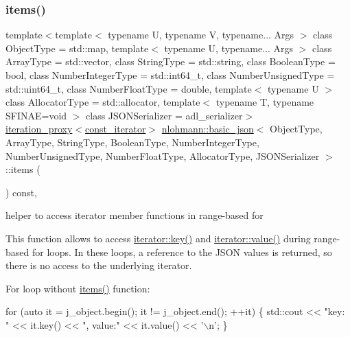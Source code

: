 \subsubsection{\texorpdfstring{items()}{items()}\hspace{0.1cm}{\footnotesize\ttfamily [2/2]}}
{\footnotesize\ttfamily template$<$template$<$ typename U, typename V, typename... Args $>$ class Object\+Type = std\+::map, template$<$ typename U, typename... Args $>$ class Array\+Type = std\+::vector, class String\+Type  = std\+::string, class Boolean\+Type  = bool, class Number\+Integer\+Type  = std\+::int64\+\_\+t, class Number\+Unsigned\+Type  = std\+::uint64\+\_\+t, class Number\+Float\+Type  = double, template$<$ typename U $>$ class Allocator\+Type = std\+::allocator, template$<$ typename T, typename S\+F\+I\+N\+A\+E=void $>$ class J\+S\+O\+N\+Serializer = adl\+\_\+serializer$>$ \\
\mbox{\hyperlink{classnlohmann_1_1detail_1_1iteration__proxy}{iteration\+\_\+proxy}}$<$\mbox{\hyperlink{classnlohmann_1_1basic__json_a41a70cf9993951836d129bb1c2b3126a}{const\+\_\+iterator}}$>$ \mbox{\hyperlink{classnlohmann_1_1basic__json}{nlohmann\+::basic\+\_\+json}}$<$ Object\+Type, Array\+Type, String\+Type, Boolean\+Type, Number\+Integer\+Type, Number\+Unsigned\+Type, Number\+Float\+Type, Allocator\+Type, J\+S\+O\+N\+Serializer $>$\+::items (\begin{DoxyParamCaption}{ }\end{DoxyParamCaption}) const\hspace{0.3cm}{\ttfamily [inline]}, {\ttfamily [noexcept]}}



helper to access iterator member functions in range-\/based for 

This function allows to access \mbox{\hyperlink{classnlohmann_1_1detail_1_1iter__impl_a15dfb2744fed2ef40c12a9e9a20d6dbc}{iterator\+::key()}} and \mbox{\hyperlink{classnlohmann_1_1detail_1_1iter__impl_ab447c50354c6611fa2ae0100ac17845c}{iterator\+::value()}} during range-\/based for loops. In these loops, a reference to the J\+S\+ON values is returned, so there is no access to the underlying iterator.

For loop without {\ttfamily \mbox{\hyperlink{classnlohmann_1_1basic__json_afe3e137ace692efa08590d8df40f58dd}{items()}}} function\+:


\begin{DoxyCode}
\textcolor{keywordflow}{for} (\textcolor{keyword}{auto} it = j\_object.begin(); it != j\_object.end(); ++it)
\{
    std::cout << \textcolor{stringliteral}{"key: "} << it.key() << \textcolor{stringliteral}{", value:"} << it.value() << \textcolor{charliteral}{'\(\backslash\)n'};
\}
\end{DoxyCode}


